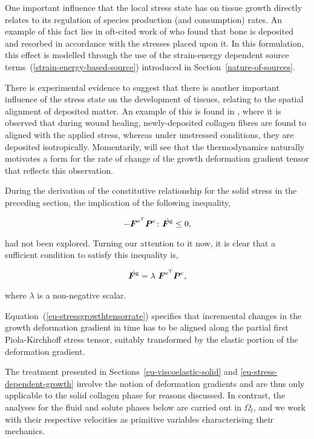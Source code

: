 One important influence that the local stress state has on tissue
growth directly relates to its regulation of species production (and
consumption) rates. An example of this fact lies in oft-cited work of
\citet{wolff1892} who found that bone is deposited and resorbed in
accordance with the stresses placed upon it. In this formulation, this
effect is modelled through the use of the strain-energy dependent
source terms~(\ref{strain-energy-based-source}) introduced in
Section~\ref{nature-of-sources}.

There is experimental evidence to suggest that there is another
important influence of the stress state on the development of tissues,
relating to the spatial alignment of deposited matter.  An example of
this is found in \citet{Provenzanoetal:2003}, where it is observed
that during wound healing, newly-de\-po\-sit\-ed collagen fibres are
found to aligned with the applied stress, whereas under unstressed
conditions, they are deposited isotropically. Momentarily, will see
that the thermodynamics naturally motivates a form for the rate of
change of the growth deformation gradient tensor that reflects this
observation.

During the derivation of the constitutive relationship for the solid
stress in the preceding section, the implication of the following
inequality,

\begin{equation*}
- \mbox{\boldmath$ F$}^{\mathrm{e}^{\mathrm{T}}}  \mbox{\boldmath$ P$}^{\mathrm{c}} \colon
\dot{\mbox{\boldmath$ F$}^{\mathrm{g}}}
\leq 0,
\end{equation*}

\noindent had not been explored. Turning our attention to it now, it
is clear that a sufficient condition to satisfy this inequality is,

\begin{equation}
\dot{\bF^{\mathrm{g}}} = \lambda\ \bF^{\mathrm{e}^{\mathrm{T}}}
\bP^{\mathrm{c}},
\label{eu-stressgrowthtensorrate}
\end{equation}

\noindent where $\lambda$ is a non-negative scalar. 

Equation~(\ref{eu-stressgrowthtensorrate}) specifies that incremental
changes in the growth deformation gradient in time has to be aligned
along the partial first Piola-Kirchhoff stress tensor, suitably
transformed by the elastic portion of the deformation gradient.

The treatment presented in Sections~\ref{eu-viscoelastic-solid} and
\ref{eu-stress-dependent-growth} involve the notion of deformation
gradients and are thus only applicable to the solid collagen phase for
reasons discussed. In contrast, the analyses for the fluid and solute
phases below are carried out in $\Omega_{t}$, and we work with their
respective velocities as primitive variables characterising their
mechanics.
 
